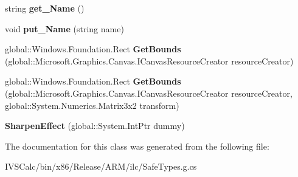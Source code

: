 \begin{DoxyCompactItemize}
\item 
\mbox{\label{class_microsoft_1_1_graphics_1_1_canvas_1_1_effects_1_1_sharpen_effect_a1d5cc57994cbfe739430c6bade4197f9}} 
string {\bfseries get\+\_\+\+Name} ()
\item 
\mbox{\label{class_microsoft_1_1_graphics_1_1_canvas_1_1_effects_1_1_sharpen_effect_a4cd2933eb68733eaaa81fa49f9170a5f}} 
void {\bfseries put\+\_\+\+Name} (string name)
\item 
\mbox{\label{class_microsoft_1_1_graphics_1_1_canvas_1_1_effects_1_1_sharpen_effect_a79a03d434e2e48956d003964879ce65c}} 
global\+::\+Windows.\+Foundation.\+Rect {\bfseries Get\+Bounds} (global\+::\+Microsoft.\+Graphics.\+Canvas.\+I\+Canvas\+Resource\+Creator resource\+Creator)
\item 
\mbox{\label{class_microsoft_1_1_graphics_1_1_canvas_1_1_effects_1_1_sharpen_effect_a54df6548305c2f7ddeba7230f7fff008}} 
global\+::\+Windows.\+Foundation.\+Rect {\bfseries Get\+Bounds} (global\+::\+Microsoft.\+Graphics.\+Canvas.\+I\+Canvas\+Resource\+Creator resource\+Creator, global\+::\+System.\+Numerics.\+Matrix3x2 transform)
\item 
\mbox{\label{class_microsoft_1_1_graphics_1_1_canvas_1_1_effects_1_1_sharpen_effect_aa2c447cd17b2262cd288cbd0ecd66538}} 
{\bfseries Sharpen\+Effect} (global\+::\+System.\+Int\+Ptr dummy)
\end{DoxyCompactItemize}


The documentation for this class was generated from the following file\+:\begin{DoxyCompactItemize}
\item 
I\+V\+S\+Calc/bin/x86/\+Release/\+A\+R\+M/ilc/Safe\+Types.\+g.\+cs\end{DoxyCompactItemize}
